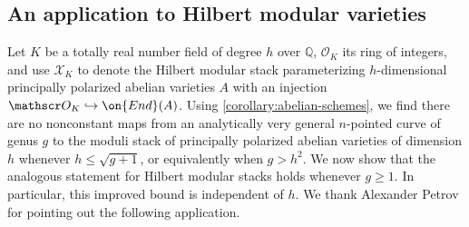 \subsection{An application to Hilbert modular varieties}
\label{subsection:hilbert-modular}

Let $K$ be a totally real number field of degree $h$ over $\mathbb Q$, $\mathscr O_K$ its ring of integers, and
use $\mathscr X_K$ to denote the Hilbert modular stack parameterizing
$h$-dimensional principally polarized abelian varieties $A$ with an injection
$\mathscr O_K \hookrightarrow \on{End}(A)$.
Using \autoref{corollary:abelian-schemes}, we find there are no nonconstant maps
from an analytically very general $n$-pointed curve of genus $g$
to the moduli stack of principally polarized abelian varieties of dimension $h$
whenever $h \leq \sqrt{g+1}$, or equivalently when $g > h^2$.
We now show that the analogous statement for Hilbert modular stacks holds
whenever $g \geq 1$.
In particular, this improved bound is independent of $h$.
We thank Alexander Petrov for pointing out the following application.

